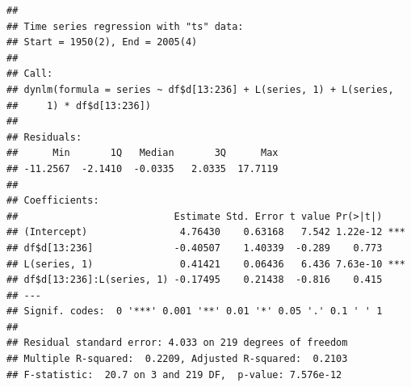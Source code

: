 \documentclass[11pt, a4paper]{report}
\newenvironment{Shaded}{\begin{snugshade}}{\end{snugshade}}
\newcommand{\DecValTok}[1]{\textcolor[rgb]{0.00,0.00,0.81}{#1}}
\newcommand{\KeywordTok}[1]{\textcolor[rgb]{0.13,0.29,0.53}{\textbf{#1}}}
\newcommand{\NormalTok}[1]{#1}
\newcommand{\OperatorTok}[1]{\textcolor[rgb]{0.81,0.36,0.00}{\textbf{#1}}}
\newcommand{\StringTok}[1]{\textcolor[rgb]{0.31,0.60,0.02}{#1}}
\theoremstyle{plain}
\theoremstyle{plain}
\theoremstyle{remark}
\begin{document}
\begin{Shaded}
\end{Shaded}

\begin{verbatim}
## 
## Time series regression with "ts" data:
## Start = 1950(2), End = 2005(4)
## 
## Call:
## dynlm(formula = series ~ df$d[13:236] + L(series, 1) + L(series, 
##     1) * df$d[13:236])
## 
## Residuals:
##      Min       1Q   Median       3Q      Max 
## -11.2567  -2.1410  -0.0335   2.0335  17.7119 
## 
## Coefficients:
##                           Estimate Std. Error t value Pr(>|t|)    
## (Intercept)                4.76430    0.63168   7.542 1.22e-12 ***
## df$d[13:236]              -0.40507    1.40339  -0.289    0.773    
## L(series, 1)               0.41421    0.06436   6.436 7.63e-10 ***
## df$d[13:236]:L(series, 1) -0.17495    0.21438  -0.816    0.415    
## ---
## Signif. codes:  0 '***' 0.001 '**' 0.01 '*' 0.05 '.' 0.1 ' ' 1
## 
## Residual standard error: 4.033 on 219 degrees of freedom
## Multiple R-squared:  0.2209, Adjusted R-squared:  0.2103 
## F-statistic:  20.7 on 3 and 219 DF,  p-value: 7.576e-12
\end{verbatim}
\end{document}
